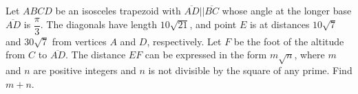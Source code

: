 Let $ ABCD$ be an isosceles trapezoid with $ \overline{AD}||\overline{BC}$ whose angle at the longer base $ \overline{AD}$ is $ \dfrac{\pi}{3}$. The diagonals have length $ 10\sqrt {21}$, and point $ E$ is at distances $ 10\sqrt {7}$ and $ 30\sqrt {7}$ from vertices $ A$ and $ D$, respectively. Let $ F$ be the foot of the altitude from $ C$ to $ \overline{AD}$. The distance $ EF$ can be expressed in the form $ m\sqrt {n}$, where $ m$ and $ n$ are positive integers and $ n$ is not divisible by the square of any prime. Find $ m + n$.
